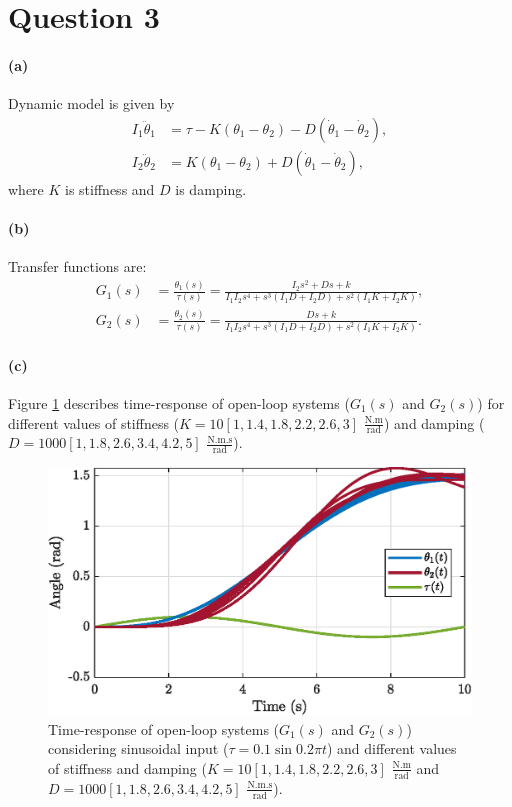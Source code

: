 \section{Question 3}
\paragraph{(a)} Dynamic model is given by
\begin{align*}
I_1 \ddot{\theta}_1 &= \tau - K(\theta_1 - \theta_2) - D(\dot{\theta}_1 - \dot{\theta}_2), 
\\
I_2 \ddot{\theta}_2 &= K(\theta_1 - \theta_2) + D(\dot{\theta}_1 - \dot{\theta}_2), 
\end{align*}
\noindent where $K$ is stiffness and $D$ is damping.


\paragraph{(b)} Transfer functions are:
\begin{align*}
G_1(s) &=\frac{\theta_1(s)}{\tau(s)} = \frac{I_2 s^2 + Ds + k}{I_1 I_2 s^4 + s^3(I_1 D + I_2 D) + s^2 (I_1 K + I_2 K) }, \\ 
G_2(s) &=\frac{\theta_2(s)}{\tau(s)} = \frac{Ds + k}{I_1 I_2 s^4 + s^3(I_1 D + I_2 D) + s^2 (I_1 K + I_2 K) }.
\end{align*}


\paragraph{(c)} Figure \ref{fig:q3_OL} describes time-response of open-loop systems ($G_1(s)$ and $G_2(s)$) for different values of stiffness ($K=10[1, 1.4, 1.8, 2.2, 2.6, 3]$ $\mathrm{\frac{N.m}{rad}}$) and damping ($D=1000[1, 1.8, 2.6, 3.4, 4.2, 5]$ $\mathrm{\frac{N.m.s}{rad}}$).

\begin{figure}[h!]
\centering
\includegraphics{images/question3/q3_OL.eps}
\caption{Time-response of open-loop systems ($G_1(s)$ and $G_2(s)$) considering sinusoidal input ($\tau=0.1\sin{0.2\pi t}$) and different values of stiffness and damping ($K=10[1, 1.4, 1.8, 2.2, 2.6, 3]$ $\mathrm{\frac{N.m}{rad}}$ and $D=1000[1, 1.8, 2.6, 3.4, 4.2, 5]$ $\mathrm{\frac{N.m.s}{rad}}$). }
\label{fig:q3_OL}
\end{figure}


